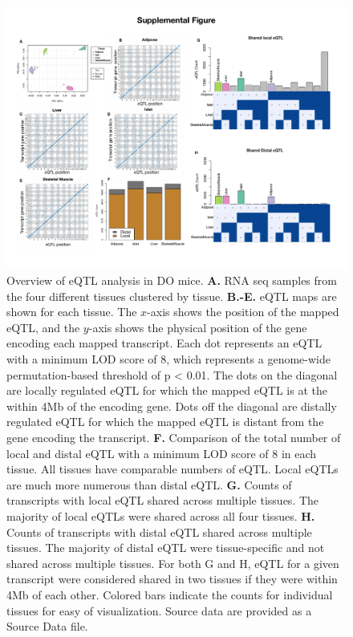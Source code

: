\documentclass[
]{article}
\begin{document}
\begin{figure}[ht!]
\includegraphics[width=\textwidth]{Figures/Supp_Fig_eQTL.pdf} 
\caption{Overview of eQTL analysis in DO mice. \textbf{A.} RNA seq 
samples from the four different tissues clustered by tissue. 
\textbf{B.-E.} eQTL maps are shown for each tissue. The $x$-axis 
shows the position of the mapped eQTL, and the $y$-axis shows the 
physical position of the gene encoding each mapped transcript. 
Each dot represents an eQTL with a minimum LOD score of 8, which 
represents a genome-wide permutation-based threshold of p < 0.01. The 
dots on the diagonal are locally regulated eQTL for which the mapped 
eQTL is at the within 4Mb of the encoding gene. Dots off the diagonal 
are distally regulated eQTL for which the mapped eQTL is distant from 
the gene encoding the transcript. \textbf{F.} Comparison of the total 
number of local and distal eQTL with a minimum LOD score of 8 in each 
tissue. All tissues have comparable numbers of eQTL. Local eQTLs are 
much more numerous than distal eQTL. \textbf{G.} Counts of transcripts 
with local eQTL shared across multiple tissues. The majority of local 
eQTLs were shared across all four tissues. \textbf{H.} Counts of 
transcripts with distal eQTL shared across multiple tissues. The majority 
of distal eQTL were tissue-specific and not shared across multiple tissues. 
For both G and H, eQTL for a given transcript were considered shared in two 
tissues if they were within 4Mb of each other. Colored bars indicate the 
counts for individual tissues for easy of visualization. Source data are 
provided as a Source Data file.
}
\label{fig:eQTL}
\end{figure}
\end{document}
